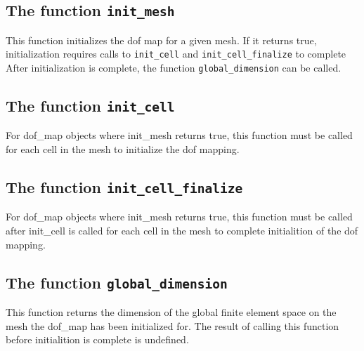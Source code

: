 
\subsection{The function \texttt{init\_mesh}}
This function initializes the dof map for a given mesh.
If it returns true, initialization requires calls to \texttt{init\_cell} and \texttt{init\_cell\_finalize} to complete
After initialization is complete, the function \texttt{global\_dimension} can be called.


\subsection{The function \texttt{init\_cell}}
For dof\_map objects where init\_mesh returns true,
this function must be called for each cell in the mesh
to initialize the dof mapping.


\subsection{The function \texttt{init\_cell\_finalize}}
For dof\_map objects where init\_mesh returns true,
this function must be called after init\_cell is called for each cell in the mesh
to complete initialition of the dof mapping.


\subsection{The function \texttt{global\_dimension}}
This function returns the dimension of the global finite element space on the mesh
the dof\_map has been initialized for.
The result of calling this function before initialition is complete is undefined.



